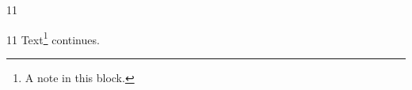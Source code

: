 \documentclass[paper=A4]{ropas-poster}
\begin{document}
\begin{postergrid}{1}{1}
\begin{posterblock}{1}{1}
Text\footnote{A note in this block.} continues.
\end{posterblock}
\end{postergrid}
\end{document}
